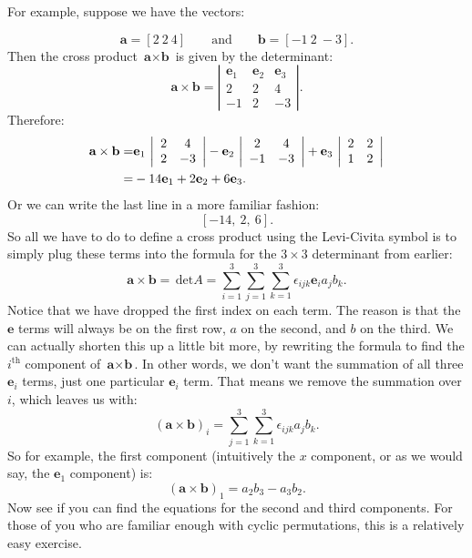 For example, suppose we have the vectors:

\[ \textbf{a}= [2~ 2~ 4] \qquad \text{and} \qquad \textbf{b}=[-1~2~-3]. \]
Then the cross product $\textbf{a} \times \textbf{b}$ is given by the determinant:
\[ \textbf{a} \times \textbf{b} =
 \left| \begin{array}{ccc}
\textbf{e}_1 & \textbf{e}_2  & \textbf{e}_3  \\
2 & 2 & 4\\
-1 & 2 & -3 \end{array} \right|.\] 
Therefore:
\begin{align}
\textbf{a} \times \textbf{b} =& \textbf{e}_1 \,
 \left| \begin{array}{cc}
2 & 4 \\
2 & -3  \end{array} \right| - \textbf{e}_2 \,
 \left| \begin{array}{cc}
2 & 4 \\
-1 & -3  \end{array} \right| + \textbf{e}_3 \,
 \left| \begin{array}{cc}
2 & 2 \\
1 & 2  \end{array} \right| \notag\\
=& -14 \textbf{e}_1 + 2 \textbf{e}_2 + 6 \textbf{e}_3.
\end{align}
Or we can write the last line in a more familiar fashion:
\[ [-14, ~ 2, ~ 6]. \] 
So all we have to do to define a cross product using the Levi-Civita symbol is to simply plug these terms into the formula for the $3 \times 3$ determinant from earlier:
\[\textbf{a} \times \textbf{b} = \,\text{det} A = \sum_{i=1}^3 \sum_{j=1}^3 \sum_{k=1}^3 \epsilon_{ijk} \textbf{e}_i  a_j b_k. \]
Notice that we have dropped the first index on each term.  The reason is that the $\textbf{e}$ terms will always be on the first row, $a$ on the second, and $b$ on the third.  
We can actually shorten this up a little bit more, by rewriting the formula to find the $i^{\text{th}}$ component of $\textbf{a} \times \textbf{b}$.  In other words, we don't want the summation of all three $\textbf{e}_i$ terms, just one particular $\textbf{e}_i$ term.  That means we remove the summation over $i$, which leaves us with:
\[ (\textbf{a} \times \textbf{b})_i = \sum_{j=1}^3 \sum_{k=1}^3 \epsilon_{ijk} a_j b_k. \]
So for example, the first component (intuitively the $x$ component, or as we would say, the $\textbf{e}_1$ component) is:
\[ (\textbf{a} \times \textbf{b})_1 = a_2 b_3 - a_3 b_2. \]
Now see if you can find the equations for the second and third components.  For those of you who are familiar enough with cyclic permutations, this is a relatively easy exercise.  

